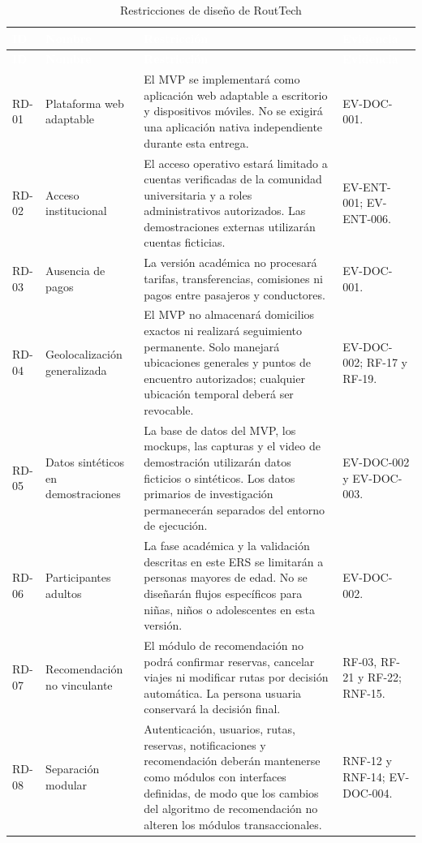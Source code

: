 \documentclass[12pt,a4paper]{article}
\begin{document}
\begin{longtable}{C{1.35cm} L{3.55cm} L{7.2cm} L{2.15cm}}
\caption{Restricciones de diseño de RoutTech}\label{tab:restricciones-diseno}\\
\textcolor{white}{\textbf{ID}} &
\textcolor{white}{\textbf{Nombre}} &
\textcolor{white}{\textbf{Restricción}} &
\textcolor{white}{\textbf{Evidencia}}\\
\endfirsthead
{}
\textcolor{white}{\textbf{ID}} &
\textcolor{white}{\textbf{Nombre}} &
\textcolor{white}{\textbf{Restricción}} &
\textcolor{white}{\textbf{Evidencia}}\\
\endhead
RD-01 & Plataforma web adaptable & El MVP se implementará como aplicación web adaptable a escritorio y dispositivos móviles. No se exigirá una aplicación nativa independiente durante esta entrega. & EV-DOC-001.\\
RD-02 & Acceso institucional & El acceso operativo estará limitado a cuentas verificadas de la comunidad universitaria y a roles administrativos autorizados. Las demostraciones externas utilizarán cuentas ficticias. & EV-ENT-001; EV-ENT-006.\\
RD-03 & Ausencia de pagos & La versión académica no procesará tarifas, transferencias, comisiones ni pagos entre pasajeros y conductores. & EV-DOC-001.\\
RD-04 & Geolocalización generalizada & El MVP no almacenará domicilios exactos ni realizará seguimiento permanente. Solo manejará ubicaciones generales y puntos de encuentro autorizados; cualquier ubicación temporal deberá ser revocable. & EV-DOC-002; RF-17 y RF-19.\\
RD-05 & Datos sintéticos en demostraciones & La base de datos del MVP, los mockups, las capturas y el video de demostración utilizarán datos ficticios o sintéticos. Los datos primarios de investigación permanecerán separados del entorno de ejecución. & EV-DOC-002 y EV-DOC-003.\\
RD-06 & Participantes adultos & La fase académica y la validación descritas en este ERS se limitarán a personas mayores de edad. No se diseñarán flujos específicos para niñas, niños o adolescentes en esta versión. & EV-DOC-002.\\
RD-07 & Recomendación no vinculante & El módulo de recomendación no podrá confirmar reservas, cancelar viajes ni modificar rutas por decisión automática. La persona usuaria conservará la decisión final. & RF-03, RF-21 y RF-22; RNF-15.\\
RD-08 & Separación modular & Autenticación, usuarios, rutas, reservas, notificaciones y recomendación deberán mantenerse como módulos con interfaces definidas, de modo que los cambios del algoritmo de recomendación no alteren los módulos transaccionales. & RNF-12 y RNF-14; EV-DOC-004.\\
\end{longtable}
\end{document}
